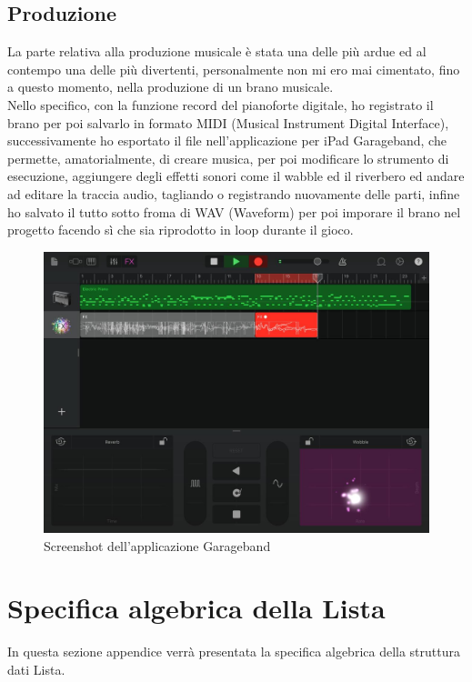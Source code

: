 \documentclass[italian,12pt,a4paper]{article}
\begin{document}
	\subsection{Produzione}
	La parte relativa alla produzione musicale è stata una delle più ardue ed al contempo una delle più divertenti, personalmente non mi ero mai cimentato, fino a questo momento, nella produzione di un brano musicale.\\
	\linebreak
	Nello specifico, con la funzione record del pianoforte digitale, ho registrato il brano per poi salvarlo in formato MIDI (Musical Instrument Digital Interface), successivamente ho esportato il file nell'applicazione per iPad Garageband, che permette, amatorialmente, di creare musica, per poi modificare lo strumento di esecuzione, aggiungere degli effetti sonori come il wabble ed il riverbero ed andare ad editare la traccia audio, tagliando o registrando nuovamente delle parti, infine ho salvato il tutto sotto froma di WAV (Waveform) per poi imporare il brano nel progetto facendo sì che sia riprodotto in loop durante il gioco. \\
	\linebreak
	\begin{figure}[!h]
		\centering
		\includegraphics[width=14cm]{garageband.jpg}
		\caption{Screenshot dell'applicazione Garageband}
		\label{fig:musica}
	\end{figure}
	
	\section{Specifica algebrica della Lista}
	In questa sezione appendice verrà presentata la specifica algebrica della struttura dati Lista.
\end{document}
